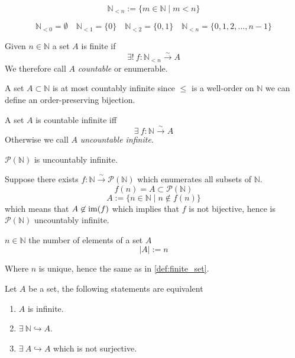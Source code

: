 \begin{definition}[\(\mathbb{N}_{<n}\)]
   \[\mathbb{N}_{<n} := \{m \in \mathbb{N} \mid m < n\}\]
\end{definition}
\begin{example}
   \[\mathbb{N}_{<0} = \emptyset \quad \mathbb{N}_{<1} = \{0\} \quad \mathbb{N}_{<2} = \{0, 1\} \quad \mathbb{N}_{<n} = \{0, 1, 2, \ldots, n - 1\}\]
\end{example}

\begin{definition}\label{def:finite_set}
   Given \(n \in \mathbb{N}\) a set \(A\) is finite if
   \[\exists!~f: \mathbb{N}_{<n} \xrightarrow{\sim} A\]
   We therefore call \(A\) \emph{countable} or enumerable.
\end{definition}
\begin{remark}
   A set \(A \subset \mathbb{N}\) is at most countably infinite since \(\leq\) is a well-order on \(\mathbb{N}\) we can define an order-preserving bijection.
\end{remark}

\begin{definition}
   A set \(A\) is countable infinite iff
   \[\exists~f: \mathbb{N} \xrightarrow{\sim} A\]
   Otherwise we call \(A\) \emph{uncountable infinite}.
\end{definition}
\begin{example}
   \(\mathcal{P}(\mathbb{N})\) is uncountably infinite.

   Suppose there exists \(f: \mathbb{N} \xrightarrow{\sim} \mathcal{P}(\mathbb{N})\) which enumerates all subsets of \(\mathbb{N}\).
   \[f(n) = A \subset \mathcal{P}(\mathbb{N})\]
   \[A := \{n \in \mathbb{N} \mid n \not\in f(n)\}\]
   which means that \(A \not\in \operatorname{im}(f)\) which implies that \(f\) is not bijective, hence is \(\mathcal{P}(\mathbb{N})\) uncountably infinite.
\end{example}

\begin{definition}[Cardinality]
   \(n \in \mathbb{N}\) the number of elements of a set \(A\)
   \[|A| := n \]
\end{definition}
\begin{remark}
   Where \(n\) is unique, hence the same as in \cref{def:finite_set}.
\end{remark}

\begin{proposition}
   Let \(A\) be a set, the following statements are equivalent
   \begin{enumerate}[label=\roman*, align=Center]
      \item \(A\) is infinite.
      \item \(\exists~\mathbb{N} \hookrightarrow A\).
      \item \(\exists~A \hookrightarrow A\) which is not surjective.
   \end{enumerate}
\end{proposition}

